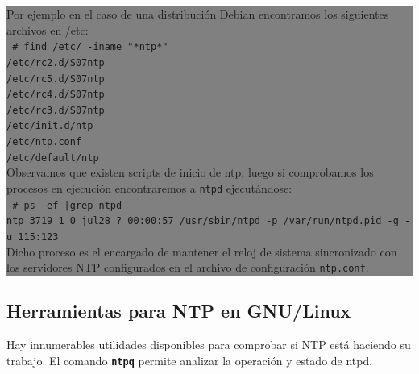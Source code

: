 \documentclass[12pt]{article}
\begin{document}
\colorbox{grey}{\parbox[t]{0.95\linewidth}{ \vspace*{0.5cm} 
Por ejemplo en el caso de una distribución Debian encontramos los siguientes 
archivos en /etc: \\ 
{\tt
\# find /etc/ -iname "*ntp*"\\
/etc/rc2.d/S07ntp\\
/etc/rc5.d/S07ntp\\
/etc/rc4.d/S07ntp\\
/etc/rc3.d/S07ntp\\
/etc/init.d/ntp\\
/etc/ntp.conf\\
/etc/default/ntp\\
 } 
Observamos que existen scripts de inicio de ntp, luego si comprobamos los procesos en 
ejecución encontraremos a \texttt{ntpd} ejecutándose:\\ 
{\tt
\# ps -ef |grep ntpd\\
ntp       3719     1  0 jul28 ?        00:00:57 /usr/sbin/ntpd -p /var/run/ntpd.pid -g -u 115:123\\
}
Dicho proceso es el encargado de mantener el reloj de sistema sincronizado con 
los servidores NTP configurados en el archivo de configuración \texttt{ntp.conf}.
\vspace*{0.5cm} } } 

\subsection*{Herramientas para NTP en GNU/Linux}

Hay innumerables utilidades disponibles para comprobar si NTP está 
haciendo su trabajo. El comando \texttt{\textbf{ntpq}} permite analizar
la operación y estado de ntpd. 
\end{document}
